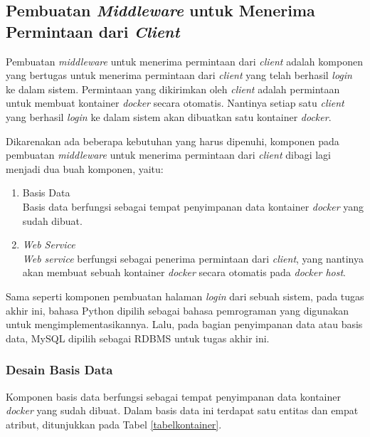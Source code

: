 \subsection{Pembuatan \textit{Middleware} untuk Menerima Permintaan dari \textit{Client}}
Pembuatan \textit{middleware} untuk menerima permintaan dari \textit{client} adalah komponen yang bertugas untuk menerima permintaan dari \textit{client} yang telah berhasil \textit{login} ke dalam sistem. Permintaan yang dikirimkan oleh \textit{client} adalah permintaan untuk membuat kontainer \textit{docker} secara otomatis. Nantinya setiap satu \textit{client} yang berhasil \textit{login} ke dalam sistem akan dibuatkan satu kontainer \textit{docker}.

Dikarenakan ada beberapa kebutuhan yang harus dipenuhi, komponen pada pembuatan \textit{middleware} untuk menerima permintaan dari \textit{client} dibagi lagi menjadi dua buah komponen, yaitu:

\begin{enumerate}
	\item Basis Data \\
	Basis data  berfungsi sebagai tempat penyimpanan data kontainer \textit{docker} yang sudah dibuat.
	\item \textit{Web Service} \\
	\textit{Web service} berfungsi sebagai penerima permintaan dari \textit{client}, yang nantinya akan membuat sebuah kontainer \textit{docker} secara otomatis pada \textit{docker host}.
\end{enumerate}

Sama seperti komponen pembuatan halaman \textit{login} dari sebuah sistem, pada tugas akhir ini, bahasa Python dipilih sebagai bahasa pemrograman yang digunakan untuk mengimplementasikannya. Lalu, pada bagian penyimpanan data atau basis data, MySQL dipilih sebagai RDBMS untuk tugas akhir ini. 

\subsubsection{Desain Basis Data}
Komponen basis data berfungsi sebagai tempat penyimpanan data kontainer \textit{docker} yang sudah dibuat. Dalam basis data ini terdapat satu entitas dan empat atribut, ditunjukkan pada Tabel \ref{tabelkontainer}.

